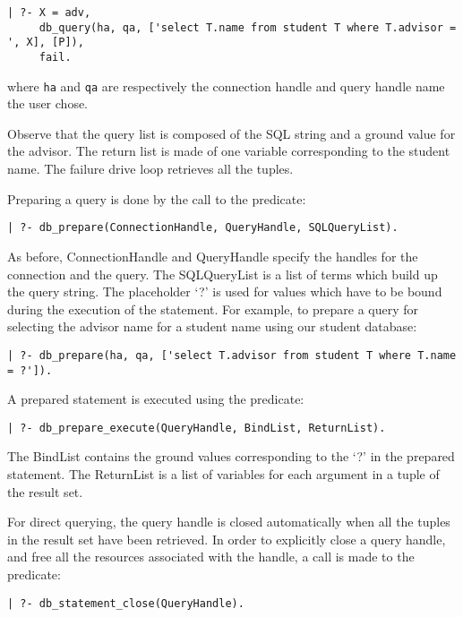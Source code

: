 \begin{verbatim}
| ?- X = adv,
     db_query(ha, qa, ['select T.name from student T where T.advisor = ', X], [P]),
     fail.
\end{verbatim}

\noindent
where {\tt ha} and {\tt qa} are respectively the connection handle and query
handle name the user chose.

Observe that the query list is composed of the SQL string and a ground value
for the advisor. The return list is made of one variable corresponding to
the student name. The failure drive loop retrieves all the tuples.

Preparing a  query is done by the call to the predicate:

\begin{verbatim}
| ?- db_prepare(ConnectionHandle, QueryHandle, SQLQueryList).
\end{verbatim}

As before, ConnectionHandle and QueryHandle specify the handles for
the connection and the query. The SQLQueryList is a list of terms which
build up the query string. The placeholder `?' is used for values which 
have to be bound during the execution of the statement.
For example, to prepare a query for selecting the advisor name for a student
name using our student database:

\begin{verbatim}
| ?- db_prepare(ha, qa, ['select T.advisor from student T where T.name = ?']).
\end{verbatim}

A prepared statement is executed using the predicate:

\begin{verbatim}
| ?- db_prepare_execute(QueryHandle, BindList, ReturnList).
\end{verbatim}

The BindList contains the ground values corresponding to the `?' in
the prepared statement. The ReturnList is a list of variables for
each argument in a tuple of the result set.

For direct querying, the query handle is closed automatically when
all the tuples in the result set have been retrieved. In order to explicitly
close a query handle, and free all the resources associated with
the handle, a call is made to the predicate:

\begin{verbatim}
| ?- db_statement_close(QueryHandle).
\end{verbatim}

